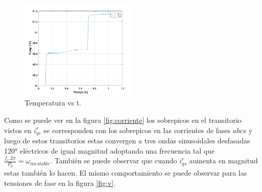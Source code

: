 \documentclass[10pt]{article}
\begin{document}
\begin{itemize}
	\begin{figure}[h!]
	\centering
	\includegraphics[width=0.5\textwidth]{temperatura.png}
	\caption{\label{fig:temperatura} Temperatura vs t.}
	\end{figure}
	\newpage
	 Como se puede ver en la figura \ref{fig:corriente} los sobrepicos en el transitorio vistos en $i^{r}_{qs}$ se corresponden con los sobrepicos en las corrientes de fases $abcs$ y luego de estos transitorios estas convergen a tres ondas sinusoidales desfasadas 120° eléctricos de igual magnitud adoptando una frecuencia tal que $\frac{f_{e}.2\pi}{P_{p}}=\omega_{mestable}$. También se puede observar que cuando $i^{r}_{qs}$ aumenta en magnitud estas también lo hacen. El mismo comportamiento se puede observar para las tensiones de fase en la figura \ref{fig:v}.




\end{itemize}
\end{document}

